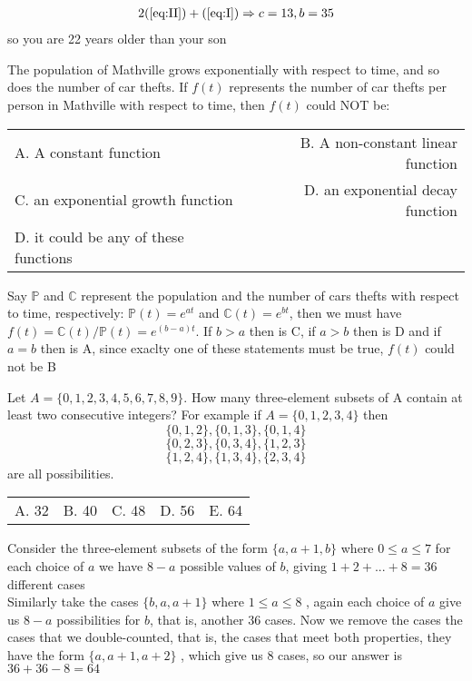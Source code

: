 \documentclass[12pt]{article}
\makeatletter
\newcounter{problem}
\newcommand{\multChoice}[5]{
    \begin{tabular}{l @{\hskip 1.5cm} l @{\hskip 1.5cm} l @{\hskip 1.5cm} l @{\hskip 1.5cm} l}
    A. #1 & B. #2 & C. #3 & D. #4 & E. #5
\end{tabular}

}
\makeatother
\begin{document}
\begin{spacing}{1.3}
\begin{solution}[D]
    \begin{align*}
        2(\ref{eq:II})+(\ref{eq:I}) \Rightarrow c=13,b=35 
    \end{align*}
    so you are 22 years older than your son
\end{solution}

\begin{problem}
      The population of Mathville grows exponentially with respect to time, and so does the number
      of car thefts. If $f(t)$ represents the number of car thefts per person in Mathville with respect to time,
      then $f(t)$ could NOT be: 
      \begin{tabular}{l r}
         A. A constant function & B. A non-constant linear function  \\
         C. an exponential growth function & D. an exponential decay function\\
         D. it could be any of these functions
         \end{tabular}
\end{problem}

\begin{solution}[B]
   Say $\mathbb{P}$ and $\mathbb{C}$ represent the population and the number of cars thefts
    with respect to time, respectively: $\mathbb{P}(t)=e^{at}$ and $\mathbb{C}(t)=e^{bt}$, 
    then we must have $f(t) = \mathbb{C}(t) / \mathbb{P}(t) = e^{(b-a)t}$.
    If $b>a$ then is C, if $a>b$ then is D and if $a=b$ then is A, since exaclty one of these statements
    must be true, $f(t)$ could not be B

\end{solution}

\begin{problem}
      Let $A = \{0,1,2,3,4,5,6,7,8,9\}$. How many three-element subsets of A contain at least two
      consecutive integers? 
      For example if $A = \{0,1,2,3,4\}$ then
      $$  \{0,1,2\} , \{0,1,3\} , \{0,1,4\}$$ 
      $$  \{0,2,3\} , \{0,3,4\} , \{1,2,3\}$$
      $$  \{1,2,4\} , \{1,3,4\} , \{2,3,4\}$$
      are all possibilities. \\
\end{problem}
\multChoice{32}{40}{48}{56}{64}
\begin{solution}[64]
   Consider the three-element subsets of the form $\{a,a+1,b\}$ where $0\leq a \leq 7$
    for each choice of $a$ we have $8-a$ possible values of $b$, giving $1+2+...+8=36$ 
    different cases\\
    Similarly take the cases $\{b,a,a+1\}$ where $1\leq a \leq 8$ , again each choice of $a$ 
    give us $8-a$ possibilities for $b$, that is, another 36 cases.
    Now we remove the cases the cases that we double-counted, that is, the cases that 
    meet both properties, they have the form $\{a,a+1,a+2\}$ , which give us 8 cases, so
    our answer is $36+36-8=64$
\end{solution}

\end{spacing}
\end{document}
